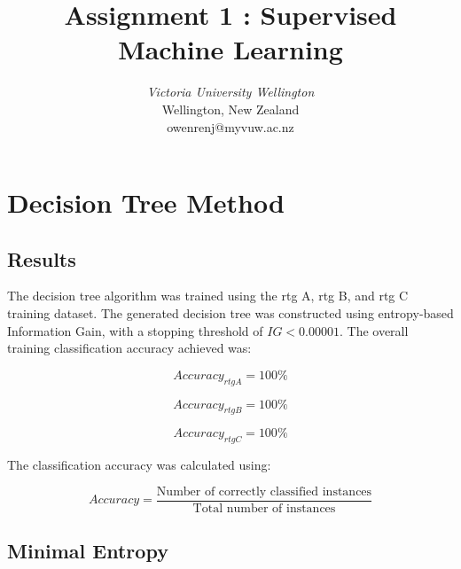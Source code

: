 \documentclass[conference,a4paper]{IEEEtran}
\begin{document}
\title{Assignment 1 : Supervised Machine Learning %
}

\author{
\textit{Victoria University Wellington}\\
Wellington, New Zealand\\
owenrenj@myvuw.ac.nz}

\maketitle

\section{Decision Tree Method}

\subsection{Results}

The decision tree algorithm was trained using the rtg A, rtg B, and rtg C training dataset. 
The generated decision tree was constructed using entropy-based Information Gain, 
with a stopping threshold of $IG < 0.00001$.
The overall training classification accuracy achieved was:

\begin{equation}
	Accuracy_{rtgA} = \text{100}\%
\end{equation}

\begin{equation}
	Accuracy_{rtgB} = \text{100}\%
\end{equation}

\begin{equation}
	Accuracy_{rtgC} = \text{100}\%
\end{equation}

The classification accuracy was calculated using:

\begin{equation}
	Accuracy = \frac{\text{Number of correctly classified instances}}
	{\text{Total number of instances}}
\end{equation}

\subsection{Minimal Entropy}
\end{document}
